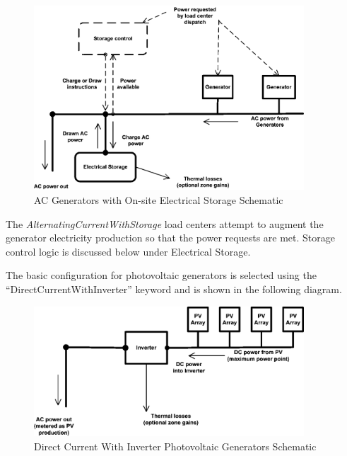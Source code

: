 \begin{figure}[hbtp] %
\centering
\includegraphics[width=0.9\textwidth, height=0.9\textheight, keepaspectratio=true]{media/image7481.png}
\caption{AC Generators with On-site Electrical Storage Schematic \protect \label{fig:ac-generators-with-on-site-electrical-storage}}
\end{figure}

The \emph{AlternatingCurrentWithStorage} load centers attempt to augment the generator electricity production so that the power requests are met. Storage control logic is discussed below under Electrical Storage.

The basic configuration for photovoltaic generators is selected using the ``DirectCurrentWithInverter'' keyword and is shown in the following diagram.

\begin{figure}[hbtp] %
\centering
\includegraphics[width=0.9\textwidth, height=0.9\textheight, keepaspectratio=true]{media/image7482.png}
\caption{Direct Current With Inverter Photovoltaic Generators Schematic \protect \label{fig:direct-current-with-inverter-photovoltaic}}
\end{figure}

